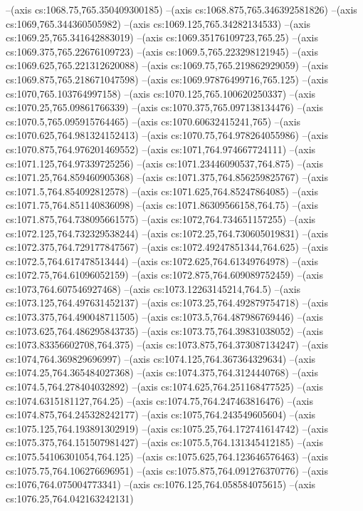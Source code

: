 --(axis cs:1068.75,765.350409300185)
--(axis cs:1068.875,765.346392581826)
--(axis cs:1069,765.344360505982)
--(axis cs:1069.125,765.34282134533)
--(axis cs:1069.25,765.341642883019)
--(axis cs:1069.35176109723,765.25)
--(axis cs:1069.375,765.22676109723)
--(axis cs:1069.5,765.223298121945)
--(axis cs:1069.625,765.221312620088)
--(axis cs:1069.75,765.219862929059)
--(axis cs:1069.875,765.218671047598)
--(axis cs:1069.97876499716,765.125)
--(axis cs:1070,765.103764997158)
--(axis cs:1070.125,765.100620250337)
--(axis cs:1070.25,765.09861766339)
--(axis cs:1070.375,765.097138134476)
--(axis cs:1070.5,765.095915764465)
--(axis cs:1070.60632415241,765)
--(axis cs:1070.625,764.981324152413)
--(axis cs:1070.75,764.978264055986)
--(axis cs:1070.875,764.976201469552)
--(axis cs:1071,764.974667724111)
--(axis cs:1071.125,764.97339725256)
--(axis cs:1071.23446090537,764.875)
--(axis cs:1071.25,764.859460905368)
--(axis cs:1071.375,764.856259825767)
--(axis cs:1071.5,764.854092812578)
--(axis cs:1071.625,764.85247864085)
--(axis cs:1071.75,764.851140836098)
--(axis cs:1071.86309566158,764.75)
--(axis cs:1071.875,764.738095661575)
--(axis cs:1072,764.734651157255)
--(axis cs:1072.125,764.732329538244)
--(axis cs:1072.25,764.730605019831)
--(axis cs:1072.375,764.729177847567)
--(axis cs:1072.49247851344,764.625)
--(axis cs:1072.5,764.617478513444)
--(axis cs:1072.625,764.61349764978)
--(axis cs:1072.75,764.61096052159)
--(axis cs:1072.875,764.609089752459)
--(axis cs:1073,764.607546927468)
--(axis cs:1073.12263145214,764.5)
--(axis cs:1073.125,764.497631452137)
--(axis cs:1073.25,764.492879754718)
--(axis cs:1073.375,764.490048711505)
--(axis cs:1073.5,764.487986769446)
--(axis cs:1073.625,764.486295843735)
--(axis cs:1073.75,764.39831038052)
--(axis cs:1073.83356602708,764.375)
--(axis cs:1073.875,764.373087134247)
--(axis cs:1074,764.369829696997)
--(axis cs:1074.125,764.367364329634)
--(axis cs:1074.25,764.365484027368)
--(axis cs:1074.375,764.3124440768)
--(axis cs:1074.5,764.278404032892)
--(axis cs:1074.625,764.251168477525)
--(axis cs:1074.6315181127,764.25)
--(axis cs:1074.75,764.247463816476)
--(axis cs:1074.875,764.245328242177)
--(axis cs:1075,764.243549605604)
--(axis cs:1075.125,764.193891302919)
--(axis cs:1075.25,764.172741614742)
--(axis cs:1075.375,764.151507981427)
--(axis cs:1075.5,764.131345412185)
--(axis cs:1075.54106301054,764.125)
--(axis cs:1075.625,764.123646576463)
--(axis cs:1075.75,764.106276696951)
--(axis cs:1075.875,764.091276370776)
--(axis cs:1076,764.075004773341)
--(axis cs:1076.125,764.058584075615)
--(axis cs:1076.25,764.042163242131)

